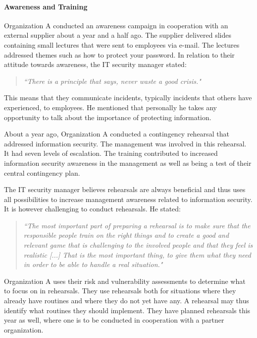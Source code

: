\paragraph{Awareness and Training}
Organization A conducted an awareness campaign in cooperation with an external supplier about a year and a half ago. The supplier delivered slides containing small lectures that were sent to employees via e-mail. The lectures addressed themes such as how to protect your password. In relation to their attitude towards awareness, the IT security manager stated: 

\begin{quote}
\textit{``There is a principle that says, never waste a good crisis."}
\end{quote}

This means that they communicate incidents, typically incidents that others have experienced, to employees. He mentioned that personally he takes any opportunity to talk about the importance of protecting information.

About a year ago, Organization A conducted a contingency rehearsal that addressed information security. The management was involved in this rehearsal. It had seven levels of escalation. The training contributed to increased information security awareness in the management as well as being a test of their central contingency plan.

The IT security manager believes rehearsals are always beneficial and thus uses all possibilities to increase management awareness related to information security. It is however challenging to conduct rehearsals. He stated:

\begin{quote}
\textit{``The most important part of preparing a rehearsal is to make sure that the responsible people train on the right things and to create a good and relevant game that is challenging to the involved people and that they feel is realistic [...] That is the most important thing, to give them what they need in order to be able to handle a real situation."}
\end{quote}

Organization A uses their risk and vulnerability assessments to determine what to focus on in rehearsals. They use rehearsals both for situations where they already have routines and where they do not yet have any. A rehearsal may thus identify what routines they should implement. They have planned rehearsals this year as well, where one is to be conducted in cooperation with a partner organization. 

